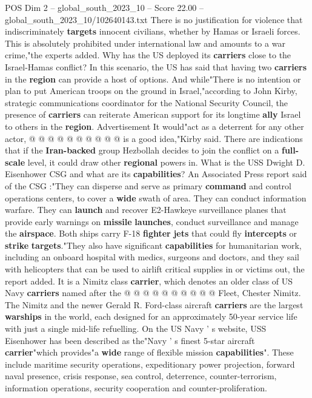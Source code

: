 \begin{textsample}{POS Dim 2 – global\_south\_2023\_10 – Score 22.00 – global\_south\_2023\_10/102640143.txt}
There is no justification for violence that indiscriminately \textbf{targets} innocent civilians, whether by Hamas or Israeli forces.
This is absolutely prohibited under international law and amounts to a war crime,"the experts added.
Why has the US deployed its \textbf{carriers} close to the Israel-Hamas conflict?
In this scenario, the US has said that having two \textbf{carriers} in the \textbf{region} can provide a host of options.
And while"There is no intention or plan to put American troops on the ground in Israel,"according to John Kirby, strategic communications coordinator for the National Security Council, the presence of \textbf{carriers} can reiterate American support for its longtime \textbf{ally} Israel to others in the \textbf{region}.
Advertisement It would"act as a deterrent for any other actor, @ @ @ @ @ @ @ @ @ @ is a good idea,"Kirby said.
There are indications that if the \textbf{Iran-backed} group Hezbollah decides to join the conflict on a \textbf{full-scale} level, it could draw other \textbf{regional} powers in.
What is the USS Dwight D.
Eisenhower CSG and what are its \textbf{capabilities}?
An Associated Press report said of the CSG :"They can disperse and serve as primary \textbf{command} and control operations centers, to cover a \textbf{wide} swath of area.
They can conduct information warfare.
They can \textbf{launch} and recover E2-Hawkeye surveillance planes that provide early warnings on \textbf{missile} \textbf{launches}, conduct surveillance and manage the \textbf{airspace}.
Both ships carry F-18 \textbf{fighter} \textbf{jets} that could fly \textbf{intercepts} or \textbf{strike} \textbf{targets}."They also have significant \textbf{capabilities} for humanitarian work, including an onboard hospital with medics, surgeons and doctors, and they sail with helicopters that can be used to airlift critical supplies in or victims out, the report added.
It is a Nimitz class \textbf{carrier}, which denotes an older class of US Navy \textbf{carriers} named after the @ @ @ @ @ @ @ @ @ @ Fleet, Chester Nimitz.
The Nimitz and the newer Gerald R.
Ford-class aircraft \textbf{carriers} are the largest \textbf{warships} in the world, each designed for an approximately 50-year service life with just a single mid-life refuelling.
On the US Navy ' s website, USS Eisenhower has been described as the"Navy ' s finest 5-star aircraft \textbf{carrier}"which provides"a \textbf{wide} range of flexible mission \textbf{capabilities}".
These include maritime security operations, expeditionary power projection, forward naval presence, crisis response, sea control, deterrence, counter-terrorism, information operations, security cooperation and counter-proliferation.

\end{textsample}
